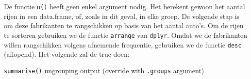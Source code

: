 \documentclass[]{tufte-book}
\newenvironment{Shaded}{}{}
\newcommand{\DataTypeTok}[1]{\textcolor[rgb]{0.56,0.13,0.00}{#1}}
\newcommand{\KeywordTok}[1]{\textcolor[rgb]{0.00,0.44,0.13}{\textbf{#1}}}
\newcommand{\NormalTok}[1]{#1}
\newcommand{\OperatorTok}[1]{\textcolor[rgb]{0.40,0.40,0.40}{#1}}
\newcommand{\StringTok}[1]{\textcolor[rgb]{0.25,0.44,0.63}{#1}}
\begin{document}
De functie \texttt{n()} heeft geen enkel argument nodig. Het berekent gewoon het aantal rijen in een data.frame, of, zoals in dit geval, in elke groep. De volgende stap is om deze fabrikanten te rangschikken op basis van het aantal auto's. Om de rijen te sorteren gebruiken we de functie \texttt{arrange} van \texttt{dplyr}. Omdat we de fabrikanten willen rangschikken volgens afnemende frequentie, gebruiken we de functie \texttt{desc} (aflopend). Het volgende zal de truc doen:

\begin{Shaded}
\end{Shaded}

\texttt{summarise()} ungrouping output (override with \texttt{.groups} argument)
\end{document}
